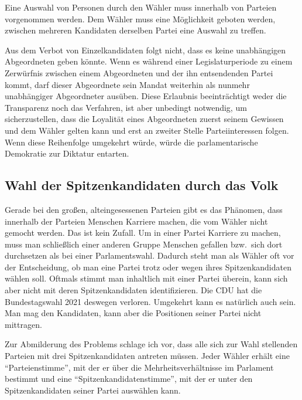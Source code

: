 
Eine Auswahl von Personen durch den Wähler muss innerhalb von Parteien vorgenommen werden. Dem
Wähler muss eine Möglichkeit geboten werden, zwischen mehreren Kandidaten derselben Partei eine
Auswahl zu treffen.


Aus dem Verbot von Einzelkandidaten folgt nicht, dass es keine unabhängigen Abgeordneten geben
könnte. Wenn es während einer Legislaturperiode zu einem Zerwürfnis zwischen einem Abgeordneten
und der ihn entsendenden Partei kommt, darf dieser Abgeordnete sein Mandat weiterhin als nunmehr
unabhängiger Abgeordneter ausüben. Diese Erlaubnis beeinträchtigt weder die Transparenz noch das
Verfahren, ist aber unbedingt notwendig, um sicherzustellen, dass die Loyalität eines Abgeordneten
zuerst seinem Gewissen und dem Wähler gelten kann und erst an zweiter Stelle Parteiinteressen
folgen. Wenn diese Reihenfolge umgekehrt würde, würde die parlamentarische Demokratie zur
Diktatur entarten.

\subsection{Wahl der Spitzenkandidaten durch das Volk} \label{sec:wahl-der-spitzenkandidaten-durch-das-volk}

Gerade bei den großen, alteingesessenen Parteien gibt es das Phänomen, dass innerhalb der
Parteien Menschen Karriere machen, die vom Wähler nicht gemocht werden. Das ist kein Zufall. Um
in einer Partei Karriere zu machen, muss man schließlich einer anderen Gruppe Menschen gefallen
bzw.\ sich dort durchsetzen als bei einer Parlamentswahl. Dadurch steht man als Wähler oft vor
der Entscheidung, ob man eine Partei trotz oder wegen ihres Spitzenkandidaten wählen soll. Oftmals
stimmt man inhaltlich mit einer Partei überein, kann sich aber nicht mit deren
Spitzenkandidaten identifizieren. Die CDU hat die Bundestagswahl 2021 deswegen verloren. Umgekehrt
kann es natürlich auch sein. Man mag den Kandidaten, kann aber die Positionen seiner Partei nicht
mittragen.

Zur Abmilderung des Problems schlage ich vor, dass alle sich zur Wahl stellenden Parteien mit
drei Spitzenkandidaten antreten müssen. Jeder Wähler erhält eine \enquote{Parteienstimme}, mit
der er über die Mehrheitsverhältnisse im Parlament bestimmt und eine
\enquote{Spitzenkandidatenstimme}, mit der er unter den Spitzenkandidaten seiner Partei auswählen
kann.

